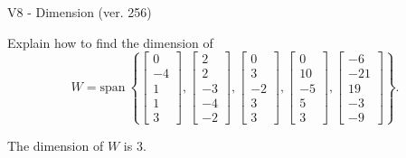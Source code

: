 \begin{exercise}
  \begin{exerciseTitle}V8 - Dimension (ver. 256)\end{exerciseTitle}
  \begin{exerciseStatement}
    Explain how to find the dimension of 
\[W=\mathrm{span}\ \left\{\left[\begin{array}{r}
0 \\
-4 \\
1 \\
1 \\
3
\end{array}\right] , \left[\begin{array}{r}
2 \\
2 \\
-3 \\
-4 \\
-2
\end{array}\right] , \left[\begin{array}{r}
0 \\
3 \\
-2 \\
3 \\
3
\end{array}\right] , \left[\begin{array}{r}
0 \\
10 \\
-5 \\
5 \\
3
\end{array}\right] , \left[\begin{array}{r}
-6 \\
-21 \\
19 \\
-3 \\
-9
\end{array}\right]\right\}.\]



  \end{exerciseStatement}
  \begin{exerciseAnswer}
   The dimension of \(W\) is  \(3\).
  


  \end{exerciseAnswer}
\end{exercise}